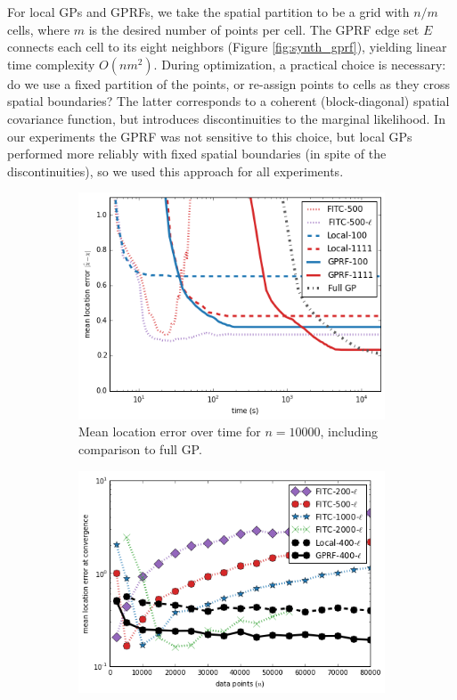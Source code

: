 \documentclass{article}
\begin{document}
For local GPs and GPRFs, we take the spatial partition to be a
grid with $n/m$ cells, where $m$ is the desired number of points per
cell.  The GPRF edge set $E$ connects each cell to its 
eight neighbors (Figure
\ref{fig:synth_gprf}), yielding linear time
complexity $O(nm^2)$. During optimization, a practical choice
is necessary: do we use a fixed partition of the points, or re-assign
points to cells as they cross spatial boundaries? The latter
corresponds to a coherent (block-diagonal) spatial covariance function, but introduces
discontinuities to the marginal likelihood. In our experiments the GPRF was not sensitive to
this choice, but local GPs performed more reliably with fixed
spatial boundaries (in spite of the discontinuities), so we used this
approach for all experiments.
\begin{figure}
\begin{subfigure}[t]{.32\textwidth}
                 \includegraphics[width=\textwidth]{truegp_bytime}
                 \caption{Mean location error over time for $n=10000$,
                   including comparison to full GP.}
                 \label{fig:truegp}
\end{subfigure}\hspace{0.5em}
\begin{subfigure}[t]{.32\textwidth}
                 \includegraphics[width=\textwidth]{fitc_scaling_lscale}

\end{subfigure}
\end{figure}
\end{document}
